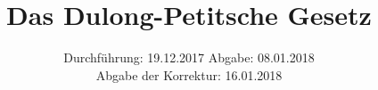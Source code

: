 

\subject{Versuch 201}
\title{Das Dulong-Petitsche Gesetz}
\date{
  Durchführung: 19.12.2017
  \hspace{3em}
  Abgabe: 08.01.2018 \\
  Abgabe der Korrektur: 16.01.2018
}


    \maketitle
    \thispagestyle{empty}
    \tableofcontents
    \newpage
    
    
    
    \newpage
    
    \newpage
    
    \newpage
    
    \printbibliography{}

